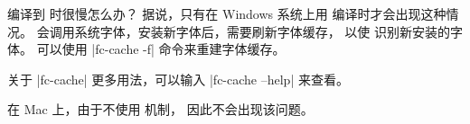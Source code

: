 \begin{myQA}{编译到  时很慢怎么办？}
据说，只有在 Windows 系统上用  编译时才会出现这种情况。
 会调用系统字体，安装新字体后，需要刷新字体缓存，
以使  识别新安装的字体。
可以使用 \code|fc-cache -f| 命令来重建字体缓存。

关于 \code|fc-cache| 更多用法，可以输入 \code|fc-cache --help| 来查看。

在 Mac 上，由于不使用  机制，
因此不会出现该问题。

\end{myQA}


